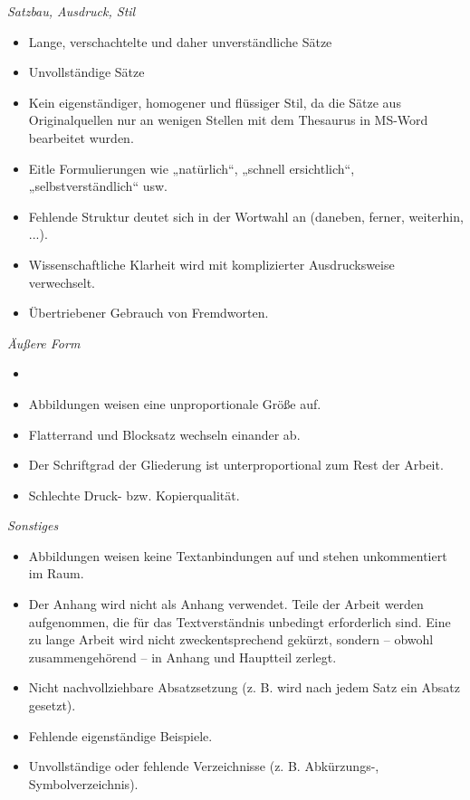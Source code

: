 \emph{Satzbau, Ausdruck, Stil}
\begin{itemize}
    \item Lange, verschachtelte und daher unverständliche Sätze
    \item Unvollständige Sätze
    \item Kein eigenständiger, homogener und flüssiger Stil, da die Sätze aus Originalquellen nur an wenigen Stellen mit dem Thesaurus in MS-Word bearbeitet wurden.
    \item Eitle Formulierungen wie „natürlich“, „schnell ersichtlich“, „selbstverständlich“ usw.
    \item Fehlende Struktur deutet sich in der Wortwahl an (daneben, ferner, weiterhin, ...).
    \item Wissenschaftliche Klarheit wird mit komplizierter Ausdrucksweise verwechselt.
    \item Übertriebener Gebrauch von Fremdworten.
\end{itemize}

\emph{Äußere Form}
\begin{itemize}
    \item 
    \item Abbildungen weisen eine unproportionale Größe auf.
    \item Flatterrand und Blocksatz wechseln einander ab.
    \item Der Schriftgrad der Gliederung ist unterproportional zum Rest der Arbeit.
    \item Schlechte Druck- bzw. Kopierqualität.
\end{itemize}

\emph{Sonstiges}
\begin{itemize}
    \item Abbildungen weisen keine Textanbindungen auf und stehen unkommentiert im Raum.
    \item Der Anhang wird nicht als Anhang verwendet. Teile der Arbeit werden aufgenommen, die für das Textverständnis unbedingt erforderlich sind. Eine zu lange Arbeit wird nicht zweckentsprechend gekürzt, sondern – obwohl zusammengehörend – in Anhang und Hauptteil zerlegt.
    \item Nicht nachvollziehbare Absatzsetzung (z. B. wird nach jedem Satz ein Absatz gesetzt).
    \item Fehlende eigenständige Beispiele.
    \item Unvollständige oder fehlende Verzeichnisse (z. B. Abkürzungs-, Symbolverzeichnis).
\end{itemize}
